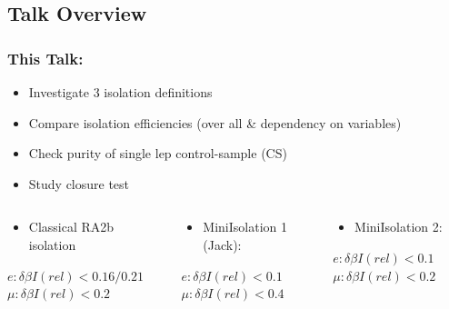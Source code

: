 \documentclass{beamer}
\begin{document}
\subsection{Talk Overview}

\begin{frame}
\frametitle{This Talk:}
\begin{itemize}
 \item Investigate 3 isolation definitions
 \item Compare isolation efficiencies (over all \& dependency on variables)
 \item Check purity of single lep control-sample (CS)
 \item Study closure test
\end{itemize}
\vskip1cm
 \begin{columns}

   \begin{column}{0.33\textwidth}
   \begin{itemize}
    \item Classical RA2b isolation
    \end{itemize}
   $e : \delta \beta I(rel)<0.16/0.21$
   $\mu : \delta \beta I(rel)<0.2$
 \end{column}
 \begin{column}{0.33\textwidth}
  \begin{itemize}
   \item MiniIsolation 1 (Jack):
   \end{itemize}
   $e : \delta \beta I(rel)<0.1$
   $\mu : \delta \beta I(rel)<0.4$
   
 \end{column}
 \begin{column}{0.33\textwidth}
  \begin{itemize}
   \item MiniIsolation 2:
   \end{itemize}
   $e : \delta \beta I(rel)<0.1$
   $\mu : \delta \beta I(rel)<0.2$
 
 \end{column}
 \end{columns}
\end{frame}
\end{document}
